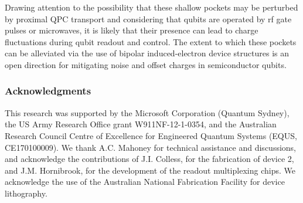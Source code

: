 Drawing attention to the possibility that these shallow pockets may be perturbed by proximal QPC transport and considering that qubits are operated by rf gate pulses or microwaves, it is likely that their presence can lead to charge fluctuations during qubit readout and control. The extent to which these pockets can be alleviated via the use of bipolar induced-electron device structures \cite{PhysRevLett.89.246801,PhysRevApplied.6.054013} is an open direction for mitigating noise and offset charges in semiconductor qubits.

\subsubsection{Acknowledgments}
This research was supported by the Microsoft Corporation (Quantum Sydney), the US Army Research Office grant W911NF-12-1-0354, and the Australian Research Council Centre of Excellence for Engineered Quantum Systems (EQUS, CE170100009). We thank A.C. Mahoney for technical assistance and discussions, and acknowledge the contributions of J.I. Colless, for the fabrication of device 2, and J.M. Hornibrook, for the development of the readout multiplexing chips. We acknowledge the use of the Australian National Fabrication Facility for device lithography.
